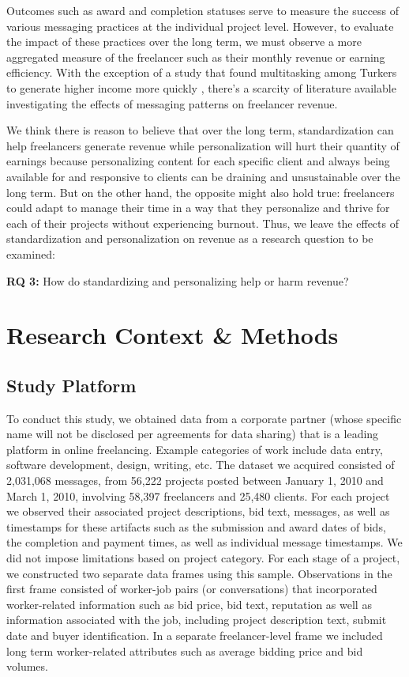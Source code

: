 Outcomes such as award and completion statuses serve to measure the success of various messaging practices at the individual project level. However, to evaluate the impact of these practices over the long term, we must observe a more aggregated measure of the freelancer such as their monthly revenue or earning efficiency. With the exception of a study that found multitasking among Turkers to generate higher income more quickly \cite{Brewster_Fitzpatrick_Cox_Kostakos_Lascau_Gould_Cox_Karmannaya_Brumby_2019}, there's a scarcity of literature available investigating the effects of messaging patterns on freelancer revenue.

We think there is reason to believe that over the long term, standardization can help freelancers generate revenue while personalization will hurt their quantity of earnings because personalizing content for each specific client and always being available for and responsive to clients can be draining and unsustainable over the long term. But on the other hand, the opposite might also hold true: freelancers could adapt to manage their time in a way that they personalize and thrive for each of their projects without experiencing burnout. Thus, we leave the effects of standardization and personalization on revenue as a research question to be examined:
\newline

\noindent\textbf{RQ 3:} How do standardizing and personalizing help or harm revenue?

\section{Research Context \& Methods}
\subsection{Study Platform}
To conduct this study, we obtained data from a corporate partner {(whose specific name will not be disclosed per agreements for data sharing)} that is a leading platform in online freelancing. {Example categories of work include data entry, software development, design, writing, etc.} The dataset we acquired consisted of {2,031,068} messages, from {56,222 } projects posted between January 1, 2010 and March 1, 2010, { involving 58,397 freelancers and 25,480} clients. For each project we observed their associated project descriptions, bid text, messages, as well as timestamps for these artifacts such as the submission and award dates of bids, the completion and payment times, as well as individual message timestamps. We did not impose limitations based on project category. For each stage of a project, we constructed two {separate data frames using this sample}. Observations in the first {frame} consisted of worker-job pairs (or conversations) that incorporated worker-related information such as bid price, bid text, reputation as well as information associated with the job, including project description text, submit date and buyer identification. In a separate freelancer{-level} {frame} we included long term worker-related attributes such as average bidding price and bid volumes.


